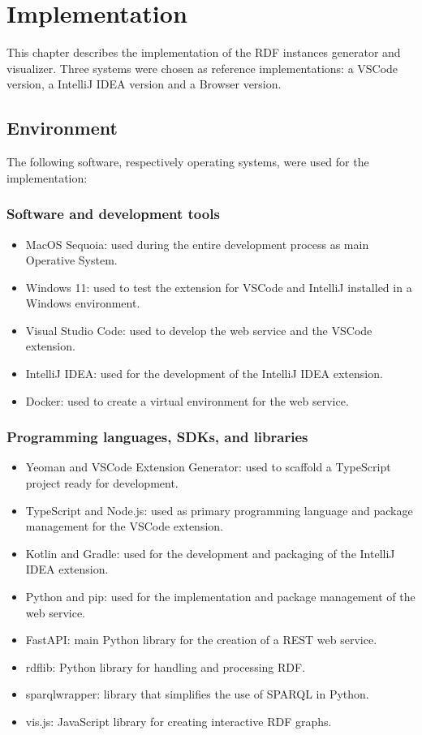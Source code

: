 \chapter{Implementation\label{cha:chapter5}}

This chapter describes the implementation of the RDF instances generator and visualizer. 
Three systems were chosen as reference implementations: a VSCode version, a IntelliJ IDEA version and a Browser version. 
\section{Environment\label{sec:env}}
The following software, respectively operating systems, were used for the implementation:

\subsection{Software and development tools\label{sec:os}}

\begin{itemize}
  \item MacOS Sequoia: used during the entire development process as main Operative System.
  \item Windows 11: used to test the extension for VSCode and IntelliJ installed in a Windows environment.
  \item Visual Studio Code: used to develop the web service and the VSCode extension.
  \item IntelliJ IDEA: used for the development of the IntelliJ IDEA extension.
  \item Docker: used to create a virtual environment for the web service.
  \end{itemize}

\subsection{Programming languages, SDKs, and libraries\label{sec:proglang}}

\begin{itemize}
    \item Yeoman and VSCode Extension Generator: used to scaffold a TypeScript project ready for development.
		\item TypeScript and Node.js: used as primary programming language and package management for the VSCode extension.
		\item Kotlin and Gradle: used for the development and packaging of the IntelliJ IDEA extension.
		\item Python and pip: used for the implementation and package management of the web service.
		\item FastAPI: main Python library for the creation of a REST web service.
		\item rdflib: Python library for handling and processing RDF.
		\item sparqlwrapper: library that simplifies the use of SPARQL in Python. 
		\item vis.js: JavaScript library for creating interactive RDF graphs.
\end{itemize}

